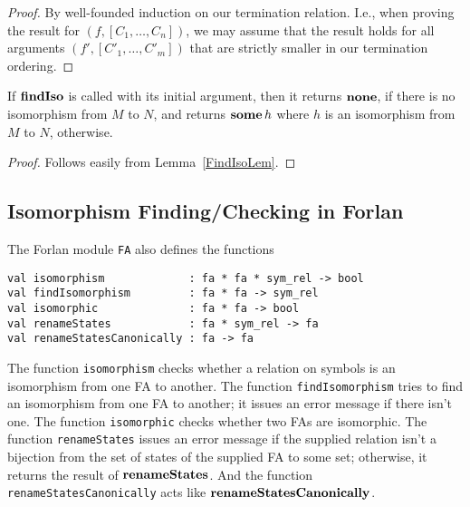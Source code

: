 \begin{proof}
By well-founded induction on our termination relation.  I.e., when
proving the result for $(f,[C_1,\ldots,C_n])$, we may assume that the
result holds for all arguments $(f',[C'_1,\ldots,C'_m])$ that are
strictly smaller in our termination ordering.
\end{proof}

\begin{theorem}
If $\mathbf{findIso}$ is called with its initial argument, then it returns
$\mathbf{none}$, if there is no isomorphism from $M$ to $N$, and returns
$\mathbf{some}\,h$ where $h$ is an isomorphism from $M$ to $N$, otherwise.
\end{theorem}

\begin{proof}
Follows easily from Lemma~\ref{FindIsoLem}.
\end{proof}

\subsection{Isomorphism Finding/Checking in Forlan}

The Forlan module \texttt{FA}
%
also defines the functions
\begin{verbatim}
val isomorphism             : fa * fa * sym_rel -> bool
val findIsomorphism         : fa * fa -> sym_rel
val isomorphic              : fa * fa -> bool
val renameStates            : fa * sym_rel -> fa
val renameStatesCanonically : fa -> fa
\end{verbatim}
%
%
%
%
%
The function \texttt{isomorphism} checks whether a relation on symbols
is an isomorphism from one FA to another.  The function
\texttt{findIsomorphism} tries to find an isomorphism from one FA to
another; it issues an error message if there isn't one.  The
function \texttt{isomorphic} checks whether two FAs are isomorphic.
The function \texttt{renameStates} issues an error message
if the supplied relation isn't a bijection from the set
of states of the supplied FA to some set; otherwise, it returns the
result of $\mathbf{renameStates}$.  And the function
\texttt{renameStatesCanonically} acts like $\mathbf{renameStatesCanonically}$.

